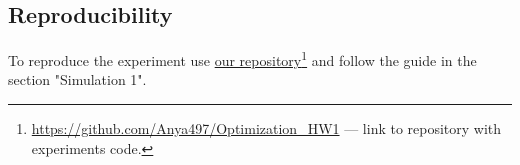 \subsection{Reproducibility}

To reproduce the experiment use \href{https://github.com/Anya497/Optimization_HW1}{our repository}\footnote{\url{https://github.com/Anya497/Optimization_HW1} --- link to repository with experiments code.} and follow the guide in the section "Simulation 1".
